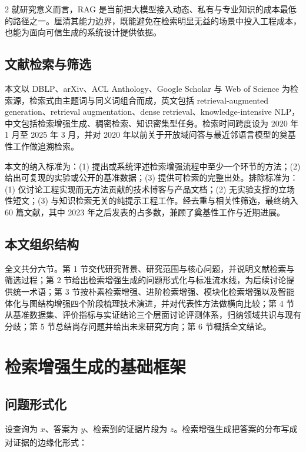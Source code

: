 \documentclass[10.5pt,compsoc,UTF8]{CjC}
\theoremstyle{mystyle}
\newcommand{\upcite}[1]{\textsuperscript{\cite{#1}}}
\begin{document}
\begin{multicols}{2}
就研究意义而言，RAG 是当前把大模型接入动态、私有与专业知识的成本最低的路径之一。厘清其能力边界，既能避免在检索明显无益的场景中投入工程成本，也能为面向可信生成的系统设计提供依据。

\subsection{\heiti 文献检索与筛选}

本文以 DBLP、arXiv、ACL Anthology、Google Scholar 与 Web of Science 为检索源，检索式由主题词与同义词组合而成，英文包括 retrieval-augmented generation、retrieval augmentation、dense retrieval、knowledge-intensive NLP，中文包括检索增强生成、稠密检索、知识密集型任务。检索时间跨度设为 2020 年 1 月至 2025 年 3 月，并对 2020 年以前关于开放域问答与最近邻语言模型的奠基性工作做追溯检索。

本文的纳入标准为：(1) 提出或系统评述检索增强流程中至少一个环节的方法；(2) 给出可复现的实验或公开的基准数据；(3) 提供可检索的完整出处。排除标准为：(1) 仅讨论工程实现而无方法贡献的技术博客与产品文档；(2) 无实验支撑的立场性短文；(3) 与知识检索无关的纯提示工程工作。经去重与相关性筛选，最终纳入 60 篇文献，其中 2023 年之后发表的占多数，兼顾了奠基性工作与近期进展。

\subsection{\heiti 本文组织结构}

全文共分六节。第 1 节交代研究背景、研究范围与核心问题，并说明文献检索与筛选过程；第 2 节给出检索增强生成的问题形式化与标准流水线，为后续讨论提供统一术语；第 3 节按朴素检索增强、进阶检索增强、模块化检索增强以及智能体化与图结构增强四个阶段梳理技术演进，并对代表性方法做横向比较；第 4 节从基准数据集、评价指标与实证结论三个层面讨论评测体系，归纳领域共识与现有分歧；第 5 节总结尚存问题并给出未来研究方向；第 6 节概括全文结论。

\section{\heiti 检索增强生成的基础框架}

\subsection{\heiti 问题形式化}

设查询为 $x$、答案为 $y$、检索到的证据片段为 $z$。检索增强生成把答案的分布写成对证据的边缘化形式\upcite{lewis2020retrieval}：


\end{multicols}
\end{document}
